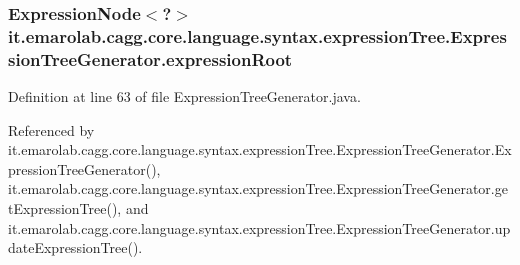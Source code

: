 \hypertarget{classit_1_1emarolab_1_1cagg_1_1core_1_1language_1_1syntax_1_1expressionTree_1_1ExpressionTreeGenerator_a825ebea5e7e193aac64454b0876f4a52}{
\subsubsection[{expression\-Root}]{\setlength{\rightskip}{0pt plus 5cm}Expression\-Node$<$?$>$ it.\-emarolab.\-cagg.\-core.\-language.\-syntax.\-expression\-Tree.\-Expression\-Tree\-Generator.\-expression\-Root\hspace{0.3cm}{\ttfamily [private]}}}\label{classit_1_1emarolab_1_1cagg_1_1core_1_1language_1_1syntax_1_1expressionTree_1_1ExpressionTreeGenerator_a825ebea5e7e193aac64454b0876f4a52}


Definition at line 63 of file Expression\-Tree\-Generator.\-java.



Referenced by it.\-emarolab.\-cagg.\-core.\-language.\-syntax.\-expression\-Tree.\-Expression\-Tree\-Generator.\-Expression\-Tree\-Generator(), it.\-emarolab.\-cagg.\-core.\-language.\-syntax.\-expression\-Tree.\-Expression\-Tree\-Generator.\-get\-Expression\-Tree(), and it.\-emarolab.\-cagg.\-core.\-language.\-syntax.\-expression\-Tree.\-Expression\-Tree\-Generator.\-update\-Expression\-Tree().

